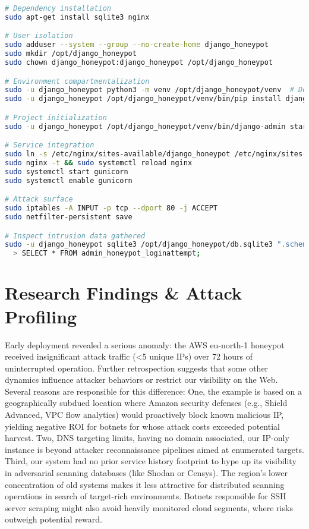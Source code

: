 \documentclass{cls/ULBreport}
\begin{document}
\begin{lstlisting}[language=bash,label={lst:cowrie-context},caption={Setup of a Django Honeypot Webservice}]  
# Dependency installation
sudo apt-get install sqlite3 nginx

# User isolation
sudo adduser --system --group --no-create-home django_honeypot
sudo mkdir /opt/django_honeypot
sudo chown django_honeypot:django_honeypot /opt/django_honeypot

# Environment compartmentalization
sudo -u django_honeypot python3 -m venv /opt/django_honeypot/venv  # Dependency isolation
sudo -u django_honeypot /opt/django_honeypot/venv/bin/pip install django django-admin-honeypot gunicorn

# Project initialization
sudo -u django_honeypot /opt/django_honeypot/venv/bin/django-admin startproject honeypot_project /opt/django_honeypot

# Service integration
sudo ln -s /etc/nginx/sites-available/django_honeypot /etc/nginx/sites-enabled/ # Exposure
sudo nginx -t && sudo systemctl reload nginx
sudo systemctl start gunicorn
sudo systemctl enable gunicorn

# Attack surface
sudo iptables -A INPUT -p tcp --dport 80 -j ACCEPT
sudo netfilter-persistent save

# Inspect intrusion data gathered
sudo -u django_honeypot sqlite3 /opt/django_honeypot/db.sqlite3 ".schema admin_honeypot_loginattempt"  # Verify capture schema
  > SELECT * FROM admin_honeypot_loginattempt;\end{lstlisting}  


\section{Research Findings \& Attack Profiling}
 
Early deployment revealed a serious anomaly: the AWS eu-north-1 honeypot received insignificant attack traffic (<5 unique IPs) over 72 hours of uninterrupted operation. Further retrospection suggests that some other dynamics influence attacker behaviors or restrict our visibility on the Web. Several reasons are responsible for this difference: One, the example is based on a geographically subdued location where Amazon security defenses (e.g., Shield Advanced, VPC flow analytics) would proactively block known malicious IP, yielding negative ROI for botnets for whose attack costs exceeded potential harvest. Two, DNS targeting limits, having no domain associated, our IP-only instance is beyond attacker reconnaissance pipelines aimed at enumerated targets. Third, our system had no prior service history footprint to hype up its visibility in adversarial scanning databases (like Shodan or Censys). The region's lower concentration of old systems makes it less attractive for distributed scanning operations in search of target-rich environments. Botnets responsible for SSH server scraping might also avoid heavily monitored cloud segments, where risks outweigh potential reward. 
\end{document}

